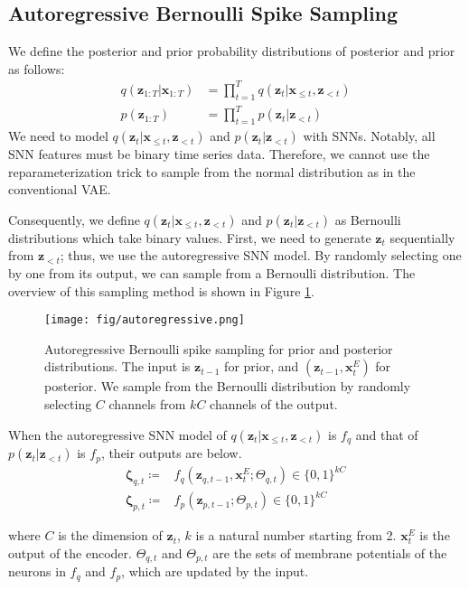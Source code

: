 \documentclass[letterpaper]{article} %
\begin{document}
\subsection{Autoregressive Bernoulli Spike Sampling}

We define the posterior and prior probability distributions of posterior and prior as follows:
\begin{align}
    q(\bm{z}_{1:T} | \bm{x}_{1:T}) &= \prod_{t=1}^T q(\bm{z}_t | \bm{x}_{\leq t}, \bm{z}_{<t}) \\
    p(\bm{z}_{1:T}) &= \prod_{t=1}^T p(\bm{z}_t | \bm{z}_{<t})
\end{align}
We need to model $q(\bm{z}_t | \bm{x}_{\leq t}, \bm{z}_{<t})$ and $p(\bm{z}_t | \bm{z}_{<t})$ with SNNs. Notably, all SNN features must be binary time series data. Therefore, we cannot use the reparameterization trick to sample from the normal distribution as in the conventional VAE.

Consequently, we define $q(\bm{z}_t | \bm{x}_{\leq t}, \bm{z}_{<t})$ and $p(\bm{z}_t | \bm{z}_{<t})$ as Bernoulli distributions which take binary values.
First, we need to generate $\bm{z}_{t}$ sequentially from $\bm{z}_{<t}$; thus, we use the autoregressive SNN model. By randomly selecting one by one from its output, we can sample from a Bernoulli distribution. The overview of this sampling method is shown in Figure \ref{fig:autoreg}.

\begin{figure}[t]
    \centering
    \texttt{[image: fig/autoregressive.png]} 
    \caption{Autoregressive Bernoulli spike sampling for prior and posterior distributions.
    The input is $\bm{z}_{t-1}$ for prior, and $(\bm{z}_{t-1}, \bm{x}^E_t)$ for posterior. We sample from the Bernoulli distribution by randomly selecting $C$ channels from $kC$ channels of the output.}
    \label{fig:autoreg}
\end{figure}

When the autoregressive SNN model of $q(\bm{z}_t | \bm{x}_{\leq t}, \bm{z}_{<t})$ is $f_q$ and that of $p(\bm{z}_t | \bm{z}_{<t})$ is $f_p$, their outputs are below.
\begin{align}
    \bm{\zeta}_{q,t} \coloneqq & f_q(\bm{z}_{q,t-1}, \bm{x}_t^E; \Theta_{q,t}) \in \{0,1\}^{kC} \\
    \bm{\zeta}_{p,t} \coloneqq & f_p(\bm{z}_{p,t-1}; \Theta_{p,t}) \in \{0,1\}^{kC}
\end{align}

\noindent where $C$ is the dimension of $\bm{z}_t$, $k$ is a natural number starting from 2. $\bm{x}_t^E$ is the output of the encoder. $\Theta_{q,t}$ and $\Theta_{p,t}$ are the sets of membrane potentials of the neurons in $f_q$ and $f_p$, which are updated by the input.
\end{document}
